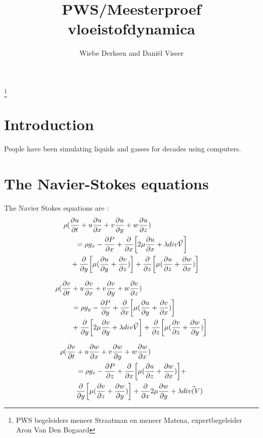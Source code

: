 \documentclass{article}
\title{PWS/Meesterproef vloeistofdynamica}
\author{Wiebe Derksen and Daniël Visser}
\begin{document}
\maketitle
\thispagestyle{empty}
\hfil
\thanks{PWS begeleiders meneer Straatman en meneer Matena, expertbegeleider Aron Van Den Bogaard}
\newpage
\tableofcontents
\newpage
\section{Introduction}
People have been simulating liquids and gasses for decades using computers.
\newpage

\section{The Navier-Stokes equations}
The Navier Stokes equations are \cite{Navier Stokes compressible}:
\begin{equation}
\begin{multlined}
\rho (\pdv{u}{t} + u \pdv{u}{x} + v \pdv{u}{y}+w\pdv{u}{z}) \\ = \rho g_{x}-\pdv{P}{x}+\pdv{x} \bqty{2\mu \pdv{u}{x} + \lambda div \vec{V}}\\ + \pdv{y} \bqty{\mu(\pdv{u}{y}+\pdv{v}{z})}+\pdv{z} \bqty{\mu (\pdv{u}{z}+\pdv{w}{x})}
\end{multlined}
\label{NSE-x}
\end{equation}

\begin{equation}
\begin{split}
\rho(\pdv{v}{t}&+u\pdv{v}{x}+v\pdv{v}{y}+w\pdv{v}{z}) \\&=\rho g_{y} -\pdv{P}{y} +\pdv{x} \bqty{\mu(\pdv{u}{y}+\pdv{v}{x})}\\&+ \pdv{y} \bqty{2\mu \pdv{v}{y} + \lambda div\vec{V}} +\pdv{z} \bqty{\mu(\pdv{v}{z}+\pdv{w}{y})}
\end{split}
\label{NSE-y}
\end{equation}

\begin{equation}
\begin{split}
\rho (\pdv{v}{t}& + u \pdv{w}{x} + v \pdv{w}{y} +  w \pdv{w}{x}) \\&= \rho g_{z} - \pdv{P}{z} + \pdv{x} \bqty{\mu(\pdv{u}{z}+\pdv{w}{x})}+\\ &\pdv{y}\bqty{\mu (\pdv{v}{z}+\pdv{w}{y})} +\pdv{x} 2\mu  \pdv{w}{y}+\lambda div \vec(V)
\label{NSE-z}
\end{split}
\end{equation}
\end{document}
